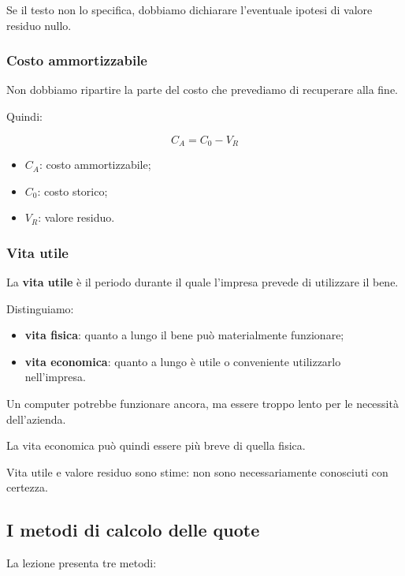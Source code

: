 \noindent Se il testo non lo specifica,
dobbiamo dichiarare l'eventuale
ipotesi di valore residuo nullo.


\subsubsection*{Costo ammortizzabile}

\noindent Non dobbiamo ripartire
la parte del costo
che prevediamo di recuperare alla fine.

\noindent Quindi:

\[
\boxed{
C_A=C_0-V_R
}
\]

\begin{itemize}
    \item $C_A$: costo ammortizzabile;
    \item $C_0$: costo storico;
    \item $V_R$: valore residuo.
\end{itemize}


\subsubsection*{Vita utile}

\noindent La \textbf{vita utile}
è il periodo durante il quale
l'impresa prevede di utilizzare il bene.

\noindent Distinguiamo:

\begin{itemize}
    \item \textbf{vita fisica}:
    quanto a lungo il bene
    può materialmente funzionare;

    \item \textbf{vita economica}:
    quanto a lungo è utile
    o conveniente utilizzarlo nell'impresa.
\end{itemize}

\noindent Un computer potrebbe
funzionare ancora,
ma essere troppo lento
per le necessità dell'azienda.

\noindent La vita economica
può quindi essere più breve
di quella fisica.

\noindent Vita utile e valore residuo
sono stime:
non sono necessariamente
conosciuti con certezza.


\subsection{I metodi di calcolo delle quote}

\noindent La lezione presenta tre metodi:

